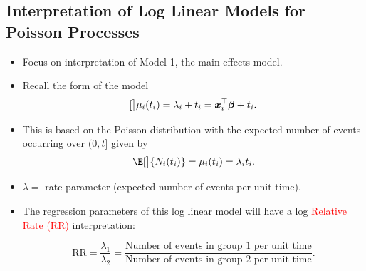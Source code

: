 \documentclass{article}\usepackage[]{graphicx}\usepackage[svgnames]{xcolor}
\let\log\relax%
\newcommand{\RR}{\text{RR}}%
\providecommand{\Vector}[1]{\bm{#1}}%
\begin{document}
\subsection*{Interpretation of Log Linear Models for Poisson Processes}
\begin{itemize}
      \item Focus on interpretation of Model 1, the main effects model.
      \item Recall the form of the model
            \[ \log[\big]{\mu_i(t_i)}=\log{\lambda_i}+\log{t_i}=\Vector{x}_i^\top \Vector{\beta}+\log{t_i}. \]
      \item This is based on the Poisson distribution with the expected number of events
            occurring over $ (0,t] $ given by
            \[ \E[\big]{N_i(t_i)}=\mu_i(t_i)=\lambda_i t_i. \]
      \item $ \lambda= $ rate parameter (expected number of events per unit time).
      \item The regression parameters of this log linear model will have a log \textcolor{Red}{Relative Rate (RR)} interpretation:
            \begin{Regular}{}
                  \[ \RR = \frac{\lambda_1}{\lambda_2}=\frac{\text{Number of events in group 1 per unit time}}{\text{Number of events in group 2 per unit time}}. \]
            \end{Regular}
\end{itemize}
\end{document}
